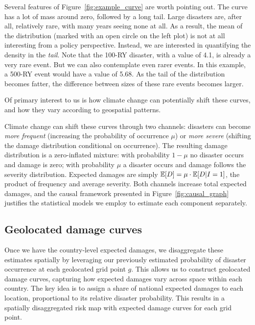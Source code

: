 Several features of Figure~\ref{fig:example_curve} are worth pointing out. The curve has a lot of mass around zero, followed by a long tail. Large disasters are, after all, relatively rare, with many years seeing none at all. As a result, the mean of the distribution (marked with an open circle on the left plot) is not at all interesting from a policy perspective. Instead, we are interested in quantifying the density in the \textit{tail}. Note that the 100-RY disaster, with a value of 4.1, is already a very rare event. But we can also contemplate even rarer events. In this example, a 500-RY event would have a value of 5.68. As the tail of the distribution becomes fatter, the difference between sizes of these rare events becomes larger.

Of primary interest to us is how climate change can potentially shift these curves, and how they vary according to geospatial patterns.

Climate change can shift these curves through two channels: disasters can become \textit{more frequent} (increasing the probability of occurrence $\mu$) or \textit{more severe} (shifting the damage distribution conditional on occurrence). The resulting damage distribution is a zero-inflated mixture: with probability $1 - \mu$ no disaster occurs and damage is zero; with probability $\mu$ a disaster occurs and damage follows the severity distribution. Expected damages are simply $\mathbb{E}[D] = \mu \cdot \mathbb{E}[D|I = 1]$, the product of frequency and average severity. Both channels increase total expected damages, and the causal framework presented in Figure~\ref{fig:causal_graph} justifies the statistical models we employ to estimate each component separately.

\subsection{Geolocated damage curves}

Once we have the country-level expected damages, we disaggregate these estimates spatially by leveraging our previously estimated probability of disaster occurrence at each geolocated grid point $g$. This allows us to construct geolocated damage curves, capturing how expected damages vary across space within each country. The key idea is to assign a share of national expected damages to each location, proportional to its relative disaster probability. This results in a spatially disaggregated risk map with expected damage curves for each grid point.

